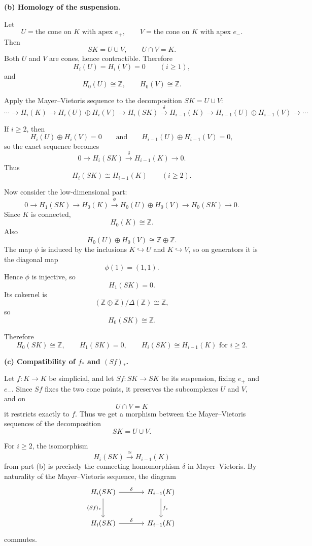 \documentclass[12pt,a4paper]{article}
\theoremstyle{notespace}
\begin{document}
\medskip

\textbf{(b) Homology of the suspension.}

Let
\[
U=\text{the cone on }K\text{ with apex }e_+,
\qquad
V=\text{the cone on }K\text{ with apex }e_-.
\]
Then
\[
SK=U\cup V,
\qquad
U\cap V=K.
\]
Both \(U\) and \(V\) are cones, hence contractible. Therefore
\[
H_i(U)=H_i(V)=0 \qquad (i\ge 1),
\]
and
\[
H_0(U)\cong \mathbb Z,\qquad H_0(V)\cong \mathbb Z.
\]

Apply the Mayer--Vietoris sequence to the decomposition \(SK=U\cup V\):
\[
\cdots \to H_i(K)\to H_i(U)\oplus H_i(V)\to H_i(SK)\xrightarrow{\delta} H_{i-1}(K)\to H_{i-1}(U)\oplus H_{i-1}(V)\to \cdots
\]

If \(i\ge 2\), then
\[
H_i(U)\oplus H_i(V)=0
\qquad\text{and}\qquad
H_{i-1}(U)\oplus H_{i-1}(V)=0,
\]
so the exact sequence becomes
\[
0\to H_i(SK)\xrightarrow{\delta} H_{i-1}(K)\to 0.
\]
Thus
\[
\boxed{H_i(SK)\cong H_{i-1}(K)\qquad (i\ge 2).}
\]

Now consider the low-dimensional part:
\[
0\to H_1(SK)\to H_0(K)\xrightarrow{\phi} H_0(U)\oplus H_0(V)\to H_0(SK)\to 0.
\]
Since \(K\) is connected,
\[
H_0(K)\cong \mathbb Z.
\]
Also
\[
H_0(U)\oplus H_0(V)\cong \mathbb Z\oplus \mathbb Z.
\]
The map \(\phi\) is induced by the inclusions \(K\hookrightarrow U\) and \(K\hookrightarrow V\), so on generators it is the diagonal map
\[
\phi(1)=(1,1).
\]
Hence \(\phi\) is injective, so
\[
H_1(SK)=0.
\]
Its cokernel is
\[
(\mathbb Z\oplus \mathbb Z)/\Delta(\mathbb Z)\cong \mathbb Z,
\]
so
\[
H_0(SK)\cong \mathbb Z.
\]

Therefore
\[
\boxed{H_0(SK)\cong \mathbb Z,\qquad H_1(SK)=0,\qquad H_i(SK)\cong H_{i-1}(K)\text{ for }i\ge 2.}
\]

\medskip

\textbf{(c) Compatibility of \(f_*\) and \((Sf)_*\).}

Let \(f:K\to K\) be simplicial, and let \(Sf:SK\to SK\) be its suspension, fixing \(e_+\) and \(e_-\). Since \(Sf\) fixes the two cone points, it preserves the subcomplexes \(U\) and \(V\), and on
\[
U\cap V=K
\]
it restricts exactly to \(f\). Thus we get a morphism between the Mayer--Vietoris sequences of the decomposition
\[
SK=U\cup V.
\]

For \(i\ge 2\), the isomorphism
\[
H_i(SK)\xrightarrow{\cong} H_{i-1}(K)
\]
from part (b) is precisely the connecting homomorphism \(\delta\) in Mayer--Vietoris. By naturality of the Mayer--Vietoris sequence, the diagram
\[
\begin{tikzcd}[column sep=large, row sep=large]
	H_i(SK) \arrow[r,"\delta"] \arrow[d,"(Sf)_*"'] & H_{i-1}(K) \arrow[d,"f_*"] \\
	H_i(SK) \arrow[r,"\delta"] & H_{i-1}(K)
\end{tikzcd}
\]
commutes.
\end{document}
